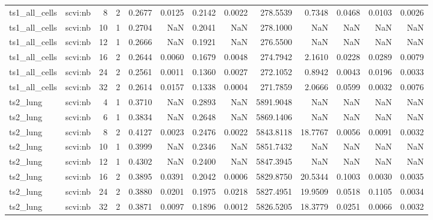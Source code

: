 \begin{tabular}{llrrrrrrrrrrr}
ts1\_all\_cells & scvi:nb & 8 & 2 & 0.2677 & 0.0125 & 0.2142 & 0.0022 & 278.5539 & 0.7348 & 0.0468 & 0.0103 & 0.0026 \\
ts1\_all\_cells & scvi:nb & 10 & 1 & 0.2704 & NaN & 0.2041 & NaN & 278.1000 & NaN & NaN & NaN & NaN \\
ts1\_all\_cells & scvi:nb & 12 & 1 & 0.2666 & NaN & 0.1921 & NaN & 276.5500 & NaN & NaN & NaN & NaN \\
ts1\_all\_cells & scvi:nb & 16 & 2 & 0.2644 & 0.0060 & 0.1679 & 0.0048 & 274.7942 & 2.1610 & 0.0228 & 0.0289 & 0.0079 \\
ts1\_all\_cells & scvi:nb & 24 & 2 & 0.2561 & 0.0011 & 0.1360 & 0.0027 & 272.1052 & 0.8942 & 0.0043 & 0.0196 & 0.0033 \\
ts1\_all\_cells & scvi:nb & 32 & 2 & 0.2614 & 0.0157 & 0.1338 & 0.0004 & 271.7859 & 2.0666 & 0.0599 & 0.0032 & 0.0076 \\
ts2\_lung & scvi:nb & 4 & 1 & 0.3710 & NaN & 0.2893 & NaN & 5891.9048 & NaN & NaN & NaN & NaN \\
ts2\_lung & scvi:nb & 6 & 1 & 0.3834 & NaN & 0.2648 & NaN & 5869.1406 & NaN & NaN & NaN & NaN \\
ts2\_lung & scvi:nb & 8 & 2 & 0.4127 & 0.0023 & 0.2476 & 0.0022 & 5843.8118 & 18.7767 & 0.0056 & 0.0091 & 0.0032 \\
ts2\_lung & scvi:nb & 10 & 1 & 0.3999 & NaN & 0.2346 & NaN & 5851.7432 & NaN & NaN & NaN & NaN \\
ts2\_lung & scvi:nb & 12 & 1 & 0.4302 & NaN & 0.2400 & NaN & 5847.3945 & NaN & NaN & NaN & NaN \\
ts2\_lung & scvi:nb & 16 & 2 & 0.3895 & 0.0391 & 0.2042 & 0.0006 & 5829.8750 & 20.5344 & 0.1003 & 0.0030 & 0.0035 \\
ts2\_lung & scvi:nb & 24 & 2 & 0.3880 & 0.0201 & 0.1975 & 0.0218 & 5827.4951 & 19.9509 & 0.0518 & 0.1105 & 0.0034 \\
ts2\_lung & scvi:nb & 32 & 2 & 0.3871 & 0.0097 & 0.1896 & 0.0012 & 5826.5205 & 18.3779 & 0.0251 & 0.0066 & 0.0032 \\
\bottomrule
\end{tabular}
